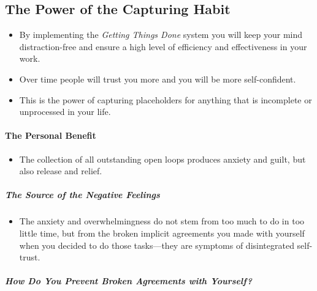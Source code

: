 \documentclass{article}
\begin{document}
\subsection{The Power of the Capturing Habit}

\begin{itemize}
 \item By implementing the \textit{Getting Things Done} system you will keep your mind distraction-free and ensure a high level of efficiency and effectiveness in your work.
 \item Over time people will trust you more and you will be more self-confident.
 \item This is the power of capturing placeholders for anything that is incomplete or unprocessed in your life.
\end{itemize}

\paragraph{The Personal Benefit}

\begin{itemize}
 \item The collection of all outstanding open loops produces anxiety and guilt, but also release and relief.
\end{itemize}

\subparagraph{The Source of the Negative Feelings}

\begin{itemize}
 \item The anxiety and overwhelmingness do not stem from too much to do in too little time, but from the broken implicit agreements you made with yourself when you decided to do those tasks---they are symptoms of disintegrated self-trust.
\end{itemize}

\subparagraph{How Do You Prevent Broken Agreements with Yourself?}
\end{document}
